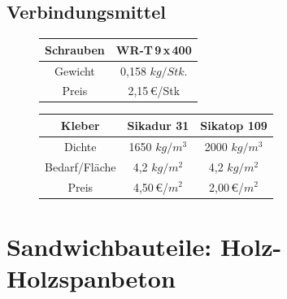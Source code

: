 \subsection{Verbindungsmittel}





\begin{figure}[h!]
\begin{tabular}{|c|c|}
\hline 
Schrauben & WR-T\,9\,x\,400  \\ 
\hline \hline
Gewicht & 0,158 $ kg/Stk.$ \\ 
\hline 
Preis & 2,15\,\euro/Stk  \\ 
\hline 
\end{tabular} 
\end{figure}	

\begin{figure}[h!]
\begin{tabular}{|c|c|c|}
\hline 
Kleber & Sikadur 31 & Sikatop 109 \\ 
\hline \hline
Dichte & 1650 $ kg/m^{3}$& 2000 $ kg/m^{3}$\\ 
\hline
Bedarf/Fläche& 4,2 $kg/m^{2} $& 4,2 $kg/m^{2} $ \\
\hline 
Preis & 4,50\,\euro/$m^{2}$ & 2,00\,\euro/$m^{2}$  \\ 
\hline 
\end{tabular} 
\end{figure}

\newpage
\section{Sandwichbauteile: Holz-Holzspanbeton}

